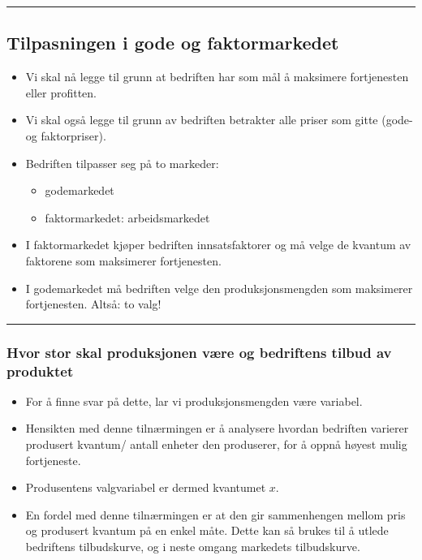 \documentclass[
  letterpaper,
  DIV=11,
  numbers=noendperiod]{scrartcl}
\providecommand{\tightlist}{%
  \setlength{\itemsep}{0pt}\setlength{\parskip}{0pt}}\usepackage{longtable,booktabs,array}
\begin{document}
\begin{center}\rule{0.5\linewidth}{0.5pt}\end{center}

\subsection{Tilpasningen i gode og
faktormarkedet}\label{tilpasningen-i-gode-og-faktormarkedet}

\begin{itemize}
\tightlist
\item
  Vi skal nå legge til grunn at bedriften har som mål å maksimere
  fortjenesten eller profitten.
\item
  Vi skal også legge til grunn av bedriften betrakter alle priser som
  gitte (gode- og faktorpriser).
\item
  Bedriften tilpasser seg på to markeder:

  \begin{itemize}
  \tightlist
  \item
    godemarkedet
  \item
    faktormarkedet: arbeidsmarkedet
  \end{itemize}
\item
  I faktormarkedet kjøper bedriften innsatsfaktorer og må velge de
  kvantum av faktorene som maksimerer fortjenesten.
\item
  I godemarkedet må bedriften velge den produksjonsmengden som
  maksimerer fortjenesten. Altså: to valg!
\end{itemize}

\begin{center}\rule{0.5\linewidth}{0.5pt}\end{center}

\subsubsection{Hvor stor skal produksjonen være og bedriftens tilbud av
produktet}\label{hvor-stor-skal-produksjonen-vuxe6re-og-bedriftens-tilbud-av-produktet}

\begin{itemize}
\tightlist
\item
  For å finne svar på dette, lar vi produksjonsmengden være variabel.
\item
  Hensikten med denne tilnærmingen er å analysere hvordan bedriften
  varierer produsert kvantum/ antall enheter den produserer, for å oppnå
  høyest mulig fortjeneste.
\item
  Produsentens valgvariabel er dermed kvantumet \(x\).
\item
  En fordel med denne tilnærmingen er at den gir sammenhengen mellom
  pris og produsert kvantum på en enkel måte. Dette kan så brukes til å
  utlede bedriftens tilbudskurve, og i neste omgang markedets
  tilbudskurve.
\end{itemize}
\end{document}
